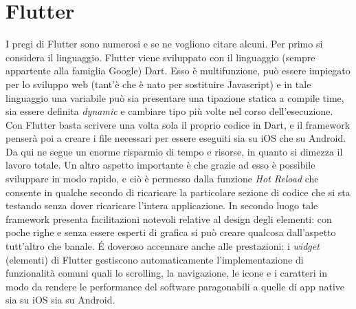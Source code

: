 \section{Flutter}
	I pregi di Flutter sono numerosi e se ne vogliono citare alcuni. \newline
	Per primo si considera il linguaggio. Flutter viene sviluppato con il
	linguaggio (sempre appartente alla famiglia Google) Dart. Esso è
	multifunzione, può essere impiegato per lo sviluppo web (tant'è che è nato
	 per sostituire Javascript) e in tale linguaggio una variabile può sia
	presentare una tipazione statica a compile time, sia essere definita
	\textit{dynamic} e cambiare tipo più
	volte nel corso dell'esecuzione. Con Flutter basta scrivere una volta sola
	il proprio codice in Dart, e il framework penserà poi a creare i file
	necessari per essere eseguiti sia su iOS che su Android. Da qui ne segue un
	enorme risparmio di tempo e risorse, in quanto si dimezza il lavoro totale.
	Un altro aspetto importante è che
	grazie ad esso è possibile sviluppare in modo rapido, e ciò è permesso dalla
	funzione \textit{Hot Reload} che consente in qualche secondo di ricaricare
	la particolare sezione di codice che si sta testando senza dover ricaricare
	l'intera applicazione. In secondo luogo tale framework presenta
	facilitazioni notevoli relative al design degli elementi: con poche righe e
	senza essere esperti di grafica si può creare qualcosa dall'aspetto tutt'altro che
	banale. \'E doveroso accennare anche alle prestazioni: i \textit{widget}
	(elementi) di Flutter gestiscono automaticamente l'implementazione di
	funzionalità comuni quali lo scrolling, la navigazione, le icone e i
	caratteri in
	modo da rendere le performance del software paragonabili a quelle di app
	native sia su iOS sia su Android. 

